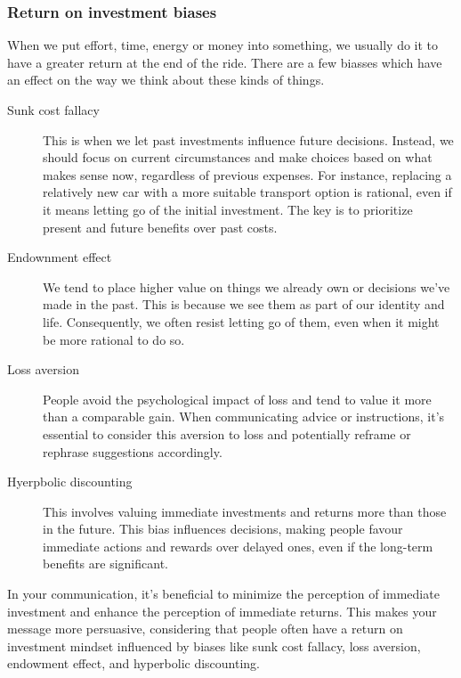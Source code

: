 \documentclass[../summary.tex]{subfiles}
\begin{document}
			\subsubsection{Return on investment biases}
				When we put effort, time, energy or money into something, we usually do it to have a greater return at the end of the ride. There are a few biasses which have an effect on the way we think about these kinds of things. 
				\begin{description}
					\item[Sunk cost fallacy] This is when we let past investments influence future decisions. Instead, we should focus on current circumstances and make choices based on what makes sense now, regardless of previous expenses. For instance, replacing a relatively new car with a more suitable transport option is rational, even if it means letting go of the initial investment. The key is to prioritize present and future benefits over past costs.
					\item[Endownment effect] We tend to place higher value on things we already own or decisions we've made in the past. This is because we see them as part of our identity and life. Consequently, we often resist letting go of them, even when it might be more rational to do so.
					\item[Loss aversion] People avoid the psychological impact of loss and tend to value it more than a comparable gain. When communicating advice or instructions, it's essential to consider this aversion to loss and potentially reframe or rephrase suggestions accordingly.
					\item[Hyerpbolic discounting] This involves valuing immediate investments and returns more than those in the future. This bias influences decisions, making people favour immediate actions and rewards over delayed ones, even if the long-term benefits are significant.
				\end{description}
				In your communication, it's beneficial to minimize the perception of immediate investment and enhance the perception of immediate returns. This makes your message more persuasive, considering that people often have a return on investment mindset influenced by biases like sunk cost fallacy, loss aversion, endowment effect, and hyperbolic discounting.
			
\end{document}

